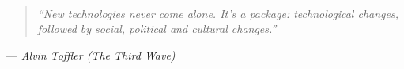 \frontmatter

\capa






\begin{folhadeaprovacao}
    \assinatura{~ }{~ } %
\end{folhadeaprovacao}






\pretextualchapter{}
  \vfill\
  \begin{flushright}
    \begin{quote}\it
    ``New technologies never come alone.
    It's a package: technological changes, followed by social, political and cultural changes.''
    \end{quote}
    --- \emph{Alvin Toffler (The Third Wave)}
  \end{flushright}

